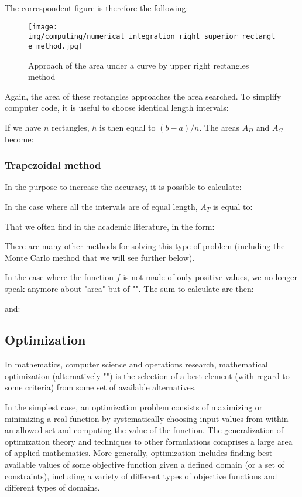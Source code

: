 	The correspondent figure is therefore the following:
	\begin{figure}[H]
		\centering
		\texttt{[image: img/computing/numerical\_integration\_right\_superior\_rectangle\_method.jpg]}
		\caption{Approach of the area under a curve by upper right rectangles method}
	\end{figure}
	Again, the area of these rectangles approaches the area searched. To simplify computer code, it is useful to choose identical length intervals:
	
	If we have $n$ rectangles, $h$ is then equal to $(b-a)/n$. The areas $A_D$ and $A_G$ become:
	
		
	
	\subsubsection{Trapezoidal method}
	In the purpose to increase the accuracy, it is possible to calculate:
	
	In the case where all the intervals are of equal length, $A_T$ is equal to:
	
	That we often find in the academic literature, in the form:
	
	There are many other methods for solving this type of problem (including the Monte Carlo method that we will see further below).
	
	In the case where the function $f$ is not made of only positive values, we no longer speak anymore about "area" but of "". The sum to calculate are then:
	
	and:
	
	
	\pagebreak
	\subsection{Optimization}
	In mathematics, computer science and operations research, mathematical optimization (alternatively "") is the selection of a best element (with regard to some criteria) from some set of available alternatives.

	In the simplest case, an optimization problem consists of maximizing or minimizing a real function by systematically choosing input values from within an allowed set and computing the value of the function. The generalization of optimization theory and techniques to other formulations comprises a large area of applied mathematics. More generally, optimization includes finding best available values of some objective function given a defined domain (or a set of constraints), including a variety of different types of objective functions and different types of domains.
	
